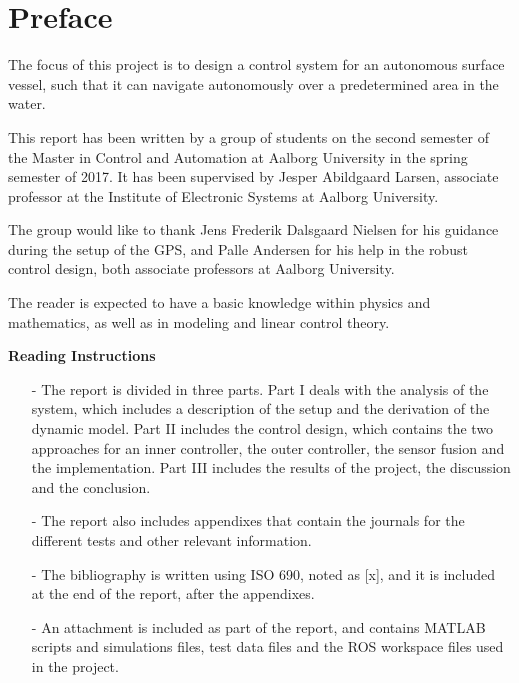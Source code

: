 \chapter*{Preface}
\vspace{-12 pt}
The focus of this project is to design a control system for an autonomous surface vessel, such that it can navigate autonomously over a predetermined area in the water.

This report has been written by a group of students on the second semester of the Master in Control and Automation at Aalborg University in the spring semester of 2017. It has been supervised by Jesper Abildgaard Larsen, associate professor at the Institute of Electronic Systems at Aalborg University. 

The group would like to thank Jens Frederik Dalsgaard Nielsen for his guidance during the setup of the GPS, and Palle Andersen for his help in the robust control design, both associate professors at Aalborg University.

The reader is expected to have a basic knowledge within physics and mathematics, as well as in modeling and linear control theory.

\textbf{Reading Instructions}
\vspace{-10 pt}
\begin{itemize}
    \item[-] The report is divided in three parts. Part I deals with the analysis of the system, which includes a description of the setup and the derivation of the dynamic model. Part II includes the control design, which contains the two approaches for an inner controller, the outer controller, the sensor fusion and the implementation. Part III includes the results of the project, the discussion and the conclusion.
    \item[-] The report also includes appendixes that contain the journals for the different tests and other relevant information.
    \item[-] The bibliography is written using ISO 690, noted as [x], and it is included at the end of the report, after the appendixes.
    \item[-] An attachment is included as part of the report, and contains MATLAB scripts and simulations files, test data files and the ROS workspace files used in the project.
\end{itemize}

